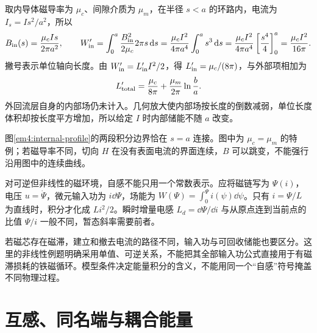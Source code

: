 取内导体磁导率为 $\mu_c$、间隙介质为 $\mu_m$，在半径 $s<a$ 的环路内，电流为 $I_s=Is^2/a^2$，所以
\[B_{\rm in}(s)=\frac{\mu_cIs}{2\pi a^2},\qquad
W'_{\rm in}=\int_0^a\frac{B_{\rm in}^2}{2\mu_c}2\pi s\mathop{}\!\mathrm d s
=\frac{\mu_cI^2}{4\pi a^4}\int_0^a s^3\mathop{}\!\mathrm d s
=\frac{\mu_cI^2}{4\pi a^4}\left[\frac{s^4}{4}\right]_0^a
=\frac{\mu_cI^2}{16\pi}.\]
撇号表示单位轴向长度。由 $W'_{\rm in}=L'_{\rm in}I^2/2$，得 $L'_{\rm in}=\mu_c/(8\pi)$，与外部项相加为
\[L'_{\rm total}=\frac{\mu_c}{8\pi}+\frac{\mu_m}{2\pi}\ln\frac ba.\]
外回流层自身的内部场仍未计入。几何放大使内部场按长度的倒数减弱，单位长度体积却按长度平方增加，所以给定 $I$ 时内部储能不随 $a$ 改变。

图\ref{em4:internal-profile}的两段积分边界恰在 $s=a$ 连接。图中为 $\mu_c=\mu_m$ 的特例；若磁导率不同，切向 $H$ 在没有表面电流的界面连续，$B$ 可以跳变，不能强行沿用图中的连续曲线。


对可逆但非线性的磁环境，自感不能只用一个常数表示。应将磁链写为 $\Psi(i)$，电压 $u=\dot\Psi$，微元输入功为 $i\dd\Psi$，场能为 $W(\Psi)=\int_0^\Psi i(\psi)\dd\psi$。只有 $i=\Psi/L$ 为直线时，积分才化成 $Li^2/2$。瞬时增量电感 $L_d=\dd\Psi/\dd i$ 与从原点连到当前点的比值 $\Psi/i$ 一般不同，暂态斜率需要前者。

若磁芯存在磁滞，建立和撤去电流的路径不同，输入功与可回收储能也要区分。这里的非线性例题明确采用单值、可逆关系，不能把其全部输入功公式直接用于有磁滞损耗的铁磁循环。模型条件决定能量积分的含义，不能用同一个“自感”符号掩盖不同物理过程。




\section{互感、同名端与耦合能量}

